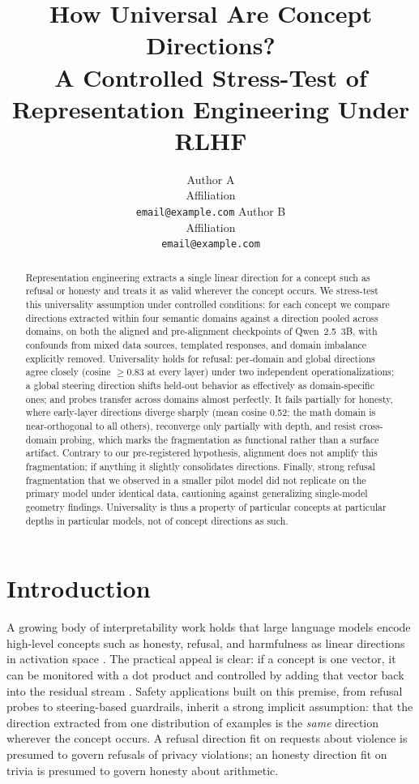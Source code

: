 \documentclass[11pt]{article}
\title{How Universal Are Concept Directions? \\ A Controlled Stress-Test of Representation Engineering Under RLHF}
\author{
  Author A \\
  Affiliation \\
  \texttt{email@example.com}
  \And
  Author B \\
  Affiliation \\
  \texttt{email@example.com}
}
\begin{document}
\maketitle

\begin{abstract}
Representation engineering extracts a single linear direction for a concept
such as refusal or honesty and treats it as valid wherever the concept
occurs. We stress-test this universality assumption under controlled
conditions: for each concept we compare directions extracted within four
semantic domains against a direction pooled across domains, on both the
aligned and pre-alignment checkpoints of Qwen~2.5~3B, with confounds from
mixed data sources, templated responses, and domain imbalance explicitly
removed. Universality holds for refusal: per-domain and global directions
agree closely (cosine $\geq 0.83$ at every layer) under two independent
operationalizations; a global steering direction shifts held-out
behavior as effectively as domain-specific ones; and probes transfer
across domains almost perfectly. It fails partially for honesty, where
early-layer directions diverge sharply (mean cosine 0.52; the math domain is
near-orthogonal to all others), reconverge only partially with depth, and
resist cross-domain probing, which marks the fragmentation as functional
rather than a surface artifact. Contrary to our pre-registered hypothesis, alignment does not
amplify this fragmentation; if anything it slightly consolidates directions.
Finally, strong refusal fragmentation that we observed in a smaller pilot
model did not replicate on the primary model under identical data,
cautioning against generalizing single-model geometry findings. Universality
is thus a property of particular concepts at particular depths in particular
models, not of concept directions as such.
\end{abstract}

\section{Introduction}
\label{sec:intro}

A growing body of interpretability work holds that large language models
encode high-level concepts such as honesty, refusal, and harmfulness as
linear directions in activation space \citep{zou2023representation,
marks2023geometry}. The practical appeal is clear: if a concept is one
vector, it can be monitored with a dot product and controlled by adding that
vector back into the residual stream \citep{turner2023activation,
li2024inference}. Safety applications built on this premise, from refusal
probes to steering-based guardrails, inherit a strong implicit assumption:
that the direction extracted from one distribution of examples is the
\emph{same} direction wherever the concept occurs. A refusal direction fit
on requests about violence is presumed to govern refusals of privacy
violations; an honesty direction fit on trivia is presumed to govern honesty
about arithmetic.
\end{document}
